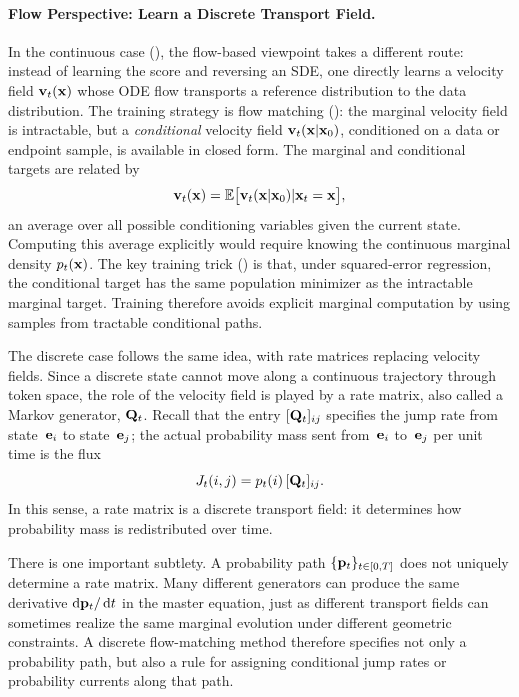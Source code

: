 \paragraph{Flow Perspective: Learn a Discrete Transport Field.}
In the continuous case (), the flow-based viewpoint
takes a different route: instead of learning the score and reversing an
SDE, one directly learns a velocity field ${\mathbf{v}}_t({\mathbf{x}})$ whose ODE flow
transports a reference distribution to the data distribution. The
training strategy is flow matching
(): the marginal velocity field is
intractable, but a \emph{conditional} velocity field
${\mathbf{v}}_t({\mathbf{x}} | {\mathbf{x}}_0)$, conditioned on a data or endpoint sample, is available in closed form. The marginal and conditional
targets are related by
\[
{\mathbf{v}}_t({\mathbf{x}})
= \mathbb{E} \big[{\mathbf{v}}_t({\mathbf{x}} | {\mathbf{x}}_0) | {\mathbf{x}}_t = {\mathbf{x}}\big],
\]
an average over all possible conditioning variables given the current state. Computing this average explicitly would require knowing the continuous marginal
density $p_t({\mathbf{x}})$.  The key training trick () is that,
under squared-error regression, the conditional target has the same population
minimizer as the intractable marginal target. Training therefore avoids explicit marginal computation by using samples from tractable conditional paths.

The discrete case follows the same idea, with rate matrices replacing velocity fields. Since a discrete state cannot
move along a continuous trajectory through token space, the role of the velocity field is played by a rate matrix, also called a
Markov generator, ${\mathbf{Q}}_t$. Recall that the entry $[{\mathbf{Q}}_t]_{ij}$ specifies
the jump rate from state~${\mathbf{e}}_i$ to state~${\mathbf{e}}_j$; the actual
probability mass sent from~${\mathbf{e}}_i$ to~${\mathbf{e}}_j$ per unit time is the flux
\[
J_t(i,j)=p_t(i)\,[{\mathbf{Q}}_t]_{ij}.
\]
In this sense, a rate matrix is a discrete transport field: it determines how probability mass is redistributed over time.

There is one important subtlety. A probability path $\{{\mathbf{p}}_t\}_{t\in[0,T]}$ does not uniquely determine a rate matrix. Many different generators can produce the same derivative $\mathop{}\!\mathrm{d}{\mathbf{p}}_t/\mathop{}\!\mathrm{d} t$ in the master equation, just as different transport fields can sometimes realize the same marginal evolution under different geometric constraints. A discrete flow-matching method therefore specifies not only a probability path, but also a rule for assigning conditional jump rates or probability currents along that path.

